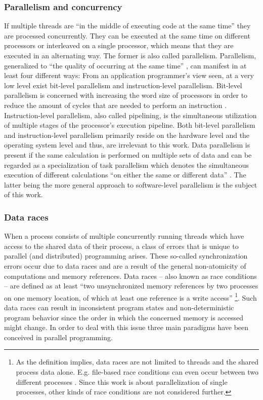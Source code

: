\subsubsection{Parallelism and concurrency}
If multiple threads are ``in the middle of executing code at the same time''\cite[p.~124(?)]{MultiProgWithJavaTech} they are processed concurrently. They can be executed at the same time on different processors or interleaved on a single processor, which means that they are executed in an alternating way. The former is also called parallelism. Parallelism, generalized to ``the quality of occurring at the same time'' \cite[p.~91]{OSs_AConceptBasedApproach}, can manifest in at least four different ways: From an application programmer's view seen, at a very low level exist bit-level parallelism and instruction-level parallelism. Bit-level parallelism is concerned with increasing the word size of processors in order to reduce the amount of cycles that are needed to perform an instruction \cite[p.~15]{ParCompArchitecture_HW/SW_Approach}. Instruction-level parallelism, also called pipelining, is the simultaneous utilization of multiple stages of the processor's execution pipeline. Both bit-level parallelism and instruction-level parallelism primarily reside on the hardware level and the operating system level and thus, are irrelevant to this work. Data parallelism is present if the same calculation is performed on multiple sets of data and can be regarded as a specialization of task parallelism which denotes the simultaneous execution of different calculations ``on either the same or different data'' \cite[p.~125]{ParCompArchitecture_HW/SW_Approach}. The latter being the more general approach to software-level parallelism is the subject of this work.

\subsubsection{Data races}
When a process consists of multiple concurrently running threads which have access to the shared data of their process, a class of errors that is unique to parallel (and distributed) programming arises. These so-called synchronization errors occur due to data races and are a result of the general non-atomicity of computations and memory references. Data races -- also known as race conditions -- are defined as at least ``two unsynchronized memory references by two processes on one memory location, of which at least one reference is a write access'' \cite[p.~327]{ParallelComputing}\footnote{As the definition implies, data races are not limited to threads and the shared process data alone. E.g. file-based race conditions can even occur between two different processes \cite{OfficialISC2Guide}. Since this work is about parallelization of single processes, other kinds of race conditions are not considered further.}. Such data races can result in inconsistent program states and non-deterministic program behavior since the order in which the concerned memory is accessed might change. In order to deal with this issue three main paradigms have been conceived in parallel programming.

